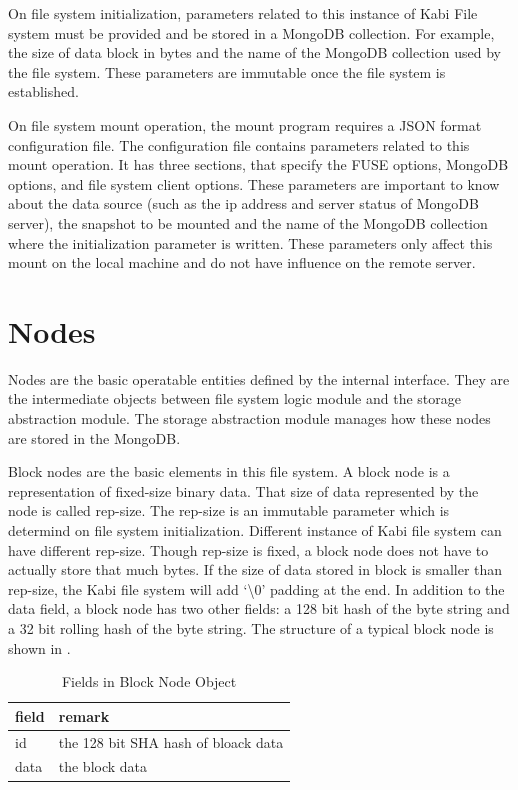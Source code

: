     On file system initialization, parameters related to this instance of Kabi File system must be provided and be stored in a MongoDB collection. For example, the size of data block in bytes and the name of the MongoDB collection used by the file system. These parameters are immutable once the file system is established.

    On file system mount operation, the mount program requires a JSON format configuration file. The configuration file contains parameters related to this mount operation. It has three sections, that specify the FUSE options, MongoDB options, and file system client options. These parameters are important to know about the data source (such as the ip address and server status of MongoDB server), the snapshot to be mounted and the name of the MongoDB collection where the initialization parameter is written. These parameters only affect this mount on the local machine and do not have influence on the remote server.

\section{Nodes}

    Nodes are the basic operatable entities defined by the internal interface. They are the intermediate objects between file system logic module and the storage abstraction module. The storage abstraction module manages how these nodes are stored in the MongoDB.

    Block nodes are the basic elements in this file system. A block node is a representation of fixed-size binary data. That size of data represented by the node is called rep-size. The rep-size is an immutable parameter which is determind on file system initialization. Different instance of Kabi file system can have different rep-size. Though rep-size is fixed, a block node does not have to actually store that much bytes. If the size of data stored in block is smaller than rep-size, the Kabi file system will add `\textbackslash0' padding at the end. In addition to the data field, a block node has two other fields: a 128 bit hash of the byte string and a 32 bit rolling hash of the byte string. The structure of a typical block node is shown in .

\begin{table}
\caption{Fields in Block Node Object}
\label{tab:block_fields}
\begin{center}
\begin{tabular}{ll}
\toprule
field & remark\\
\midrule
id & the 128 bit SHA hash of bloack data\\
data & the block data\\
\bottomrule
\end{tabular}
\end{center}
\end{table}

